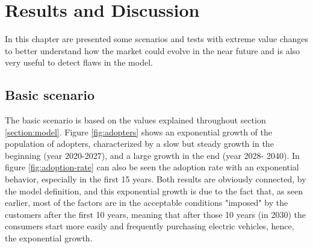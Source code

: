 \section{Results and Discussion} \label{section:results}
In this chapter are presented some scenarios and tests with extreme value changes to better understand how the market could evolve in the near future and is also very useful to detect flaws in the model.

\subsection{Basic scenario}
The basic scenario is based on the values explained throughout section \ref{section:model}. Figure \ref{fig:adopters} shows an exponential growth of the population of adopters, characterized by a slow
but steady growth in the beginning (year 2020-2027), and a large growth in the end (year 2028-
2040). In figure \ref{fig:adoption-rate} can also be seen the adoption rate with an exponential behavior, especially in the first 15 years. Both results are obviously connected, by the model definition, and this exponential growth is due to the fact that, as seen earlier, most of the factors are in the acceptable conditions "imposed" by the customers after the first 10 years, meaning that after those 10 years (in 2030) the consumers start more easily and frequently purchasing electric vehicles, hence, the exponential growth.

